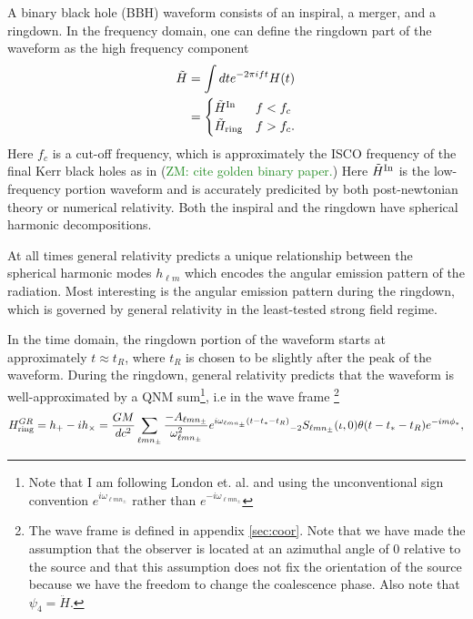 \documentclass[aps,prd,amsmath,showpacs,amssymb,superscriptaddress,nofootinbib,longbibliography,eqsecnum,preprintnumbers]{revtex4-1}
\newcommand{\Sph}{{}_{-2}S_{\ell m n_{\pm}}}
\newcommand{\mul}{{\ell m n_{\pm}}}
\newcommand{\zach}[1]{\textcolor{ForestGreen}{#1}}
\begin{document}
A binary black hole (BBH) waveform   consists of an inspiral, a merger, and a ringdown. In the frequency domain, one can define the ringdown part of the waveform as the high frequency component 
\begin{align}
\tilde H&=\int dt e^{-2\pi i f t} H(t) 
\nonumber \\
&=
\begin{cases}
\tilde H^{\rm In}& f<f_c \\
\tilde H_{\rm ring}& f>f_c.
\end{cases}
\end{align}
Here $f_c$ is a cut-off frequency, which is approximately the ISCO frequency of the final Kerr black holes as in (\zach{ZM: cite golden binary paper.})
Here $\tilde H ^{\rm In}$ is the low-frequency portion waveform and is accurately predicited by both post-newtonian theory or numerical relativity. Both the inspiral and the ringdown have spherical harmonic decompositions. 

At all times general relativity predicts a unique relationship between the spherical harmonic modes $h_{\ell m}$ which encodes the angular emission pattern of the radiation. Most interesting is the angular emission pattern during the ringdown, which is governed by general relativity in the least-tested strong field regime.

In the time domain, the ringdown portion of the waveform starts at approximately $t\approx t_R$, where $t_R$ is chosen to be slightly after the peak of the waveform. During the ringdown, general relativity predicts that the waveform is well-approximated by a QNM sum\footnote{Note that I am following London et. al. and using the unconventional sign convention $e^{i\omega_\mul}$ rather than $e^{-i\omega_\mul}$}, i.e in the wave frame \footnote{The wave frame is defined in appendix \ref{sec:coor}. Note that we have made the assumption that the observer is located at an azimuthal angle of 0 relative to the source and that this assumption does not fix the orientation of the source because we have the freedom to change the coalescence phase. Also note that $\psi_4= \ddot H$.}
\begin{align}
H_{\rm ring}^{GR}=h_+-ih_\times=\frac{GM}{dc^2}\sum_{\ell m n_{\pm}}\frac{-A_{\ell m n_{\pm}}}{\omega_\mul^2}e^{i\omega_{\ell m n_{\pm}}(t-t_*-t_R)}\Sph(\iota,0)\theta(t-t_*-t_R)e^{-im\phi_*},
\end{align}
\end{document}
